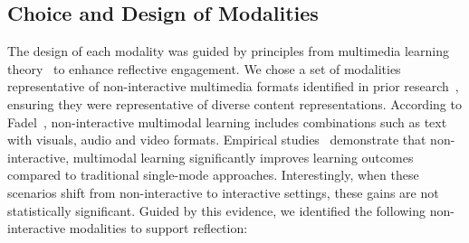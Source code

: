 \subsection{Choice and Design of Modalities}
\label{sec: Modalities}
The design of each modality was guided by principles from multimedia learning theory~\cite{mayer2005cambridge, fadel2008multimodal} to enhance reflective engagement. We chose a set of modalities representative of non-interactive multimedia formats identified in prior research~\cite{mayer2005cognitive, de2005multimedia, deimann2006volitional, fadel2008multimodal}, ensuring they were representative of diverse content representations. According to Fadel~\cite{fadel2008multimodal}, non-interactive multimodal learning includes combinations such as text with visuals, audio and video formats. Empirical studies~\cite{mayer2005cognitive, de2005multimedia, deimann2006volitional, fadel2008multimodal} demonstrate that non-interactive, multimodal learning significantly improves learning outcomes compared to traditional single-mode approaches. Interestingly, when these scenarios shift from non-interactive to interactive settings, these gains are not statistically significant. Guided by this evidence, we identified the following non-interactive modalities to support reflection:
